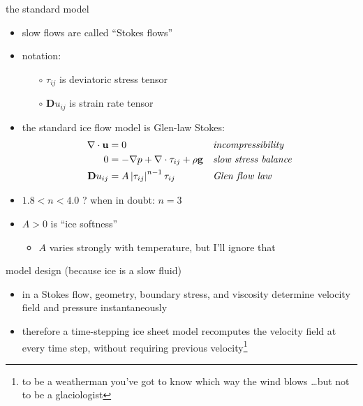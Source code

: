 \documentclass[hide notes,intlimits]{beamer}
\begin{document}
\begin{frame}{the standard model}

\begin{itemize}
\item slow flows are called ``Stokes flows''
\item notation:
  \begin{itemize}
  \item[$\circ$] $\tau_{ij}$ is deviatoric stress tensor
  \item[$\circ$] $\mathbf{D}u_{ij}$ is strain rate tensor
  \end{itemize}
\smallskip
\item the standard ice flow model is Glen-law Stokes:
\begin{align*}
\nabla \cdot \mathbf{u} &= 0 &&\text{\emph{incompressibility}} \\
0 &= - \nabla p + \nabla \cdot \tau_{ij} + \rho \mathbf{g} &&\text{\emph{slow stress balance}} \\
\mathbf{D}u_{ij} &= A \left|\tau_{ij}\right|^{n-1} \tau_{ij} &&\text{\emph{Glen flow law}}
\end{align*}
\item $1.8 < n < 4.0$ ?  \quad \alert{when in doubt: $n=3$}
\medskip
\item $A>0$ is ``ice softness''
   \begin{itemize}
   \item $A$ varies strongly with temperature, but I'll ignore that
   \end{itemize}
\end{itemize}
\end{frame}


\begin{frame}{model design (because ice is a slow fluid)}

\begin{itemize}
\item  in a Stokes flow, geometry, boundary stress, and viscosity determine velocity field and pressure instantaneously
\item therefore a time-stepping ice sheet model recomputes the velocity field at every time step, without requiring previous velocity\footnote{to be a weatherman you've got to know which way the wind blows \dots but not to be a glaciologist}
\end{itemize}
\end{frame}
\end{document}
